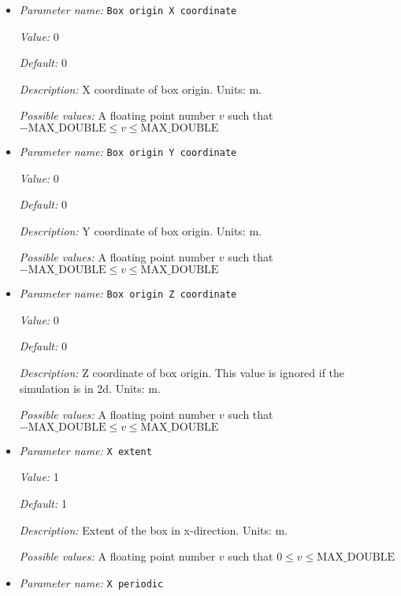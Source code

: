\begin{itemize}
\item {\it Parameter name:} {\tt Box origin X coordinate}
\label{parameters:Geometry model/Box/Box origin X coordinate}


{\it Value:} 0


{\it Default:} 0


{\it Description:} X coordinate of box origin. Units: m.


{\it Possible values:} A floating point number $v$ such that $-\text{MAX\_DOUBLE} \leq v \leq \text{MAX\_DOUBLE}$
\item {\it Parameter name:} {\tt Box origin Y coordinate}
\label{parameters:Geometry model/Box/Box origin Y coordinate}


{\it Value:} 0


{\it Default:} 0


{\it Description:} Y coordinate of box origin. Units: m.


{\it Possible values:} A floating point number $v$ such that $-\text{MAX\_DOUBLE} \leq v \leq \text{MAX\_DOUBLE}$
\item {\it Parameter name:} {\tt Box origin Z coordinate}
\label{parameters:Geometry model/Box/Box origin Z coordinate}


{\it Value:} 0


{\it Default:} 0


{\it Description:} Z coordinate of box origin. This value is ignored if the simulation is in 2d. Units: m.


{\it Possible values:} A floating point number $v$ such that $-\text{MAX\_DOUBLE} \leq v \leq \text{MAX\_DOUBLE}$
\item {\it Parameter name:} {\tt X extent}
\label{parameters:Geometry model/Box/X extent}


{\it Value:} 1


{\it Default:} 1


{\it Description:} Extent of the box in x-direction. Units: m.


{\it Possible values:} A floating point number $v$ such that $0 \leq v \leq \text{MAX\_DOUBLE}$
\item {\it Parameter name:} {\tt X periodic}
\label{parameters:Geometry model/Box/X periodic}



\end{itemize}
